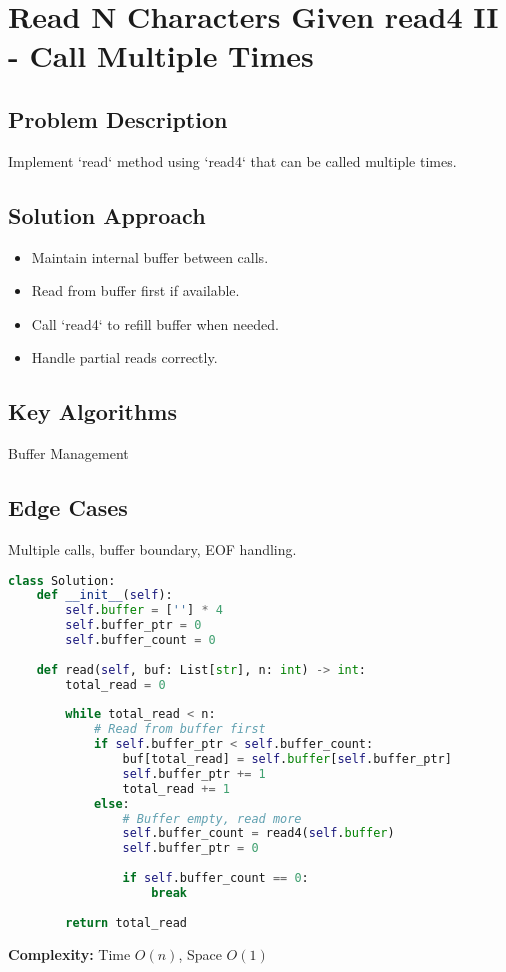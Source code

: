 \documentclass[10pt, a4paper]{article}
\begin{document}
\section{Read N Characters Given read4 II - Call Multiple Times}
\subsection*{Problem Description}
Implement `read` method using `read4` that can be called multiple times.

\subsection*{Solution Approach}
\begin{itemize}
    \item Maintain internal buffer between calls.
    \item Read from buffer first if available.
    \item Call `read4` to refill buffer when needed.
    \item Handle partial reads correctly.
\end{itemize}

\subsection*{Key Algorithms}
Buffer Management

\subsection*{Edge Cases}
Multiple calls, buffer boundary, EOF handling.

\begin{lstlisting}[language=Python]
class Solution:
    def __init__(self):
        self.buffer = [''] * 4
        self.buffer_ptr = 0
        self.buffer_count = 0
    
    def read(self, buf: List[str], n: int) -> int:
        total_read = 0
        
        while total_read < n:
            # Read from buffer first
            if self.buffer_ptr < self.buffer_count:
                buf[total_read] = self.buffer[self.buffer_ptr]
                self.buffer_ptr += 1
                total_read += 1
            else:
                # Buffer empty, read more
                self.buffer_count = read4(self.buffer)
                self.buffer_ptr = 0
                
                if self.buffer_count == 0:
                    break
        
        return total_read
\end{lstlisting}
\textbf{Complexity:} Time $O(n)$, Space $O(1)$
\end{document}

